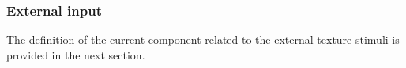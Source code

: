 \subsubsection{External input}

The definition of the current component related to the external texture stimuli is provided in the next section.